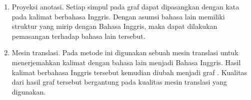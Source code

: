 \begin{enumerate}
  \item Proyeksi anotasi.
  Setiap simpul pada graf \AMR{} dapat dipasangkan dengan kata pada kalimat berbahasa Inggris.
  Dengan asumsi bahasa lain memiliki struktur yang mirip dengan Bahasa Inggris, maka dapat dilakukan pemasangan terhadap bahasa lain tersebut.


  \item Mesin translasi.
  Pada metode ini digunakan sebuah mesin translasi untuk menerjemahkan kalimat dengan bahasa lain menjadi Bahasa Inggris.
  Hasil kalimat berbahasa Inggris tersebut kemudian diubah menjadi graf \AMR{}.
  Kualitas dari hasil graf \AMR{} tersebut bergantung pada kualitas mesin translasi yang digunakan.

\end{enumerate}

